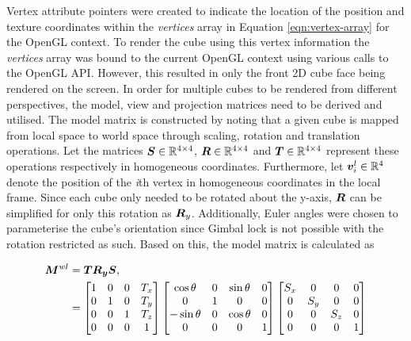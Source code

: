 Vertex attribute pointers were created to indicate the location of the position and texture coordinates within the \textit{vertices} array in Equation \ref{eqn:vertex-array} for the OpenGL context. To render the cube using this vertex information the \textit{vertices} array was bound to the current OpenGL context using various calls to the OpenGL API. However, this resulted in only the front 2D cube face being rendered on the screen. In order for multiple cubes to be rendered from different perspectives, the model, view and projection matrices need to be derived and utilised. The model matrix is constructed by noting that a given cube is mapped from local space to world space through scaling, rotation and translation operations. Let the matrices $\bm{S}\in\mathbb{R}^{4\times4}$, $\bm{R}\in\mathbb{R}^{4\times4}$ and $\bm{T}\in\mathbb{R}^{4\times4}$ represent these operations respectively in homogeneous coordinates. Furthermore, let $\bm{v}^l_i\in\mathbb{R}^4$ denote the position of the \textit{i}th vertex in homogeneous coordinates in the local frame. Since each cube only needed to be rotated about the y-axis, $\bm{R}$ can be simplified for only this rotation as $\bm{R}_y$. Additionally, Euler angles were chosen to parameterise the cube's orientation since Gimbal lock is not possible with the rotation restricted as such. Based on this, the model matrix is calculated as

\begin{align}
	\bm{M}^{wl}&=\bm{T}\bm{R_y}\bm{S},\\
	&=
	\begin{bmatrix}
		1 & 0 & 0 & T_x\\
		0 & 1 & 0 & T_y\\
		0 & 0 & 1 & T_z\\
		0 & 0 & 0 & 1
	\end{bmatrix}
	\begin{bmatrix}
		\cos\theta & 0 & \sin\theta & 0\\
		0 & 1 & 0 & 0\\
		-\sin\theta & 0 & \cos\theta & 0\\
		0 & 0 & 0 & 1
	\end{bmatrix}
	\begin{bmatrix}
		S_x & 0 & 0 & 0\\
		0 & S_y & 0 & 0\\
		0 & 0 & S_z & 0\\
		0 & 0 & 0 & 1
	\end{bmatrix}
\end{align}


